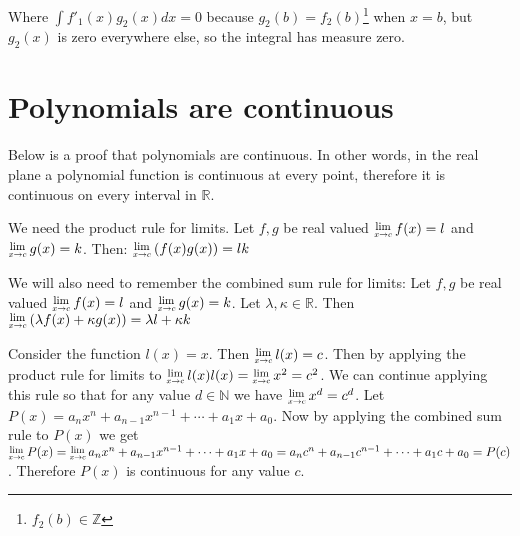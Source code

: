 \documentclass[12pt]{article}
\newcommand{\Lim}[1]{\raisebox{0.5ex}{\scalebox{0.8}{$\displaystyle \lim_{#1}\;$}}}
\begin{document}
\begin{appendices}
Where $\int f'_1(x) g_2(x) dx = 0$ because $g_2(b) = f_2(b)$\footnote{$f_2(b) \in \mathbb{Z}$} when $x=b$, but $g_2(x)$ is zero everywhere else, so the integral has measure zero.



\section*{Polynomials are continuous}
Below is a proof that polynomials are continuous.  In other words, in the real plane a polynomial function is continuous at every point, therefore it is continuous on every interval in $\mathbb{R}$.

We need the product rule for limits.  Let $f,g$ be real valued $\Lim{x \rightarrow c} f(x) = l$ and $\Lim{x \rightarrow c} g(x) = k$.  Then: $\Lim{x \rightarrow c}(f(x)g(x)) = lk$

We will also need to remember the combined sum rule for limits:
Let $f,g$ be real valued $\Lim{x \rightarrow c} f(x) = l$ and $\Lim{x \rightarrow c} g(x) = k$.  Let $\lambda, \kappa \in \mathbb{R}$.  Then $\Lim{x \rightarrow c}(\lambda f(x) + \kappa g(x)) = \lambda l + \kappa k$

Consider the function $l(x) = x$.  Then $\Lim{x \rightarrow c} l(x) =c$.  Then by applying the product rule for limits to $\Lim{x \rightarrow c} l(x) l(x) = \Lim{x \rightarrow c} x^2 =c^2$.  We can continue applying this rule so that for any value $d \in \mathbb{N}$ we have $\Lim{x \rightarrow c} x^d = c^d$.  Let $P(x)=a_nx^n +a_{n-1}x^{n-1}+ \cdots + a_1x+a_0$.  Now by applying the combined sum rule to $P(x)$ we get $\Lim{x \rightarrow c} P(x) = \Lim{x \rightarrow c} a_nx^n +a_{n-1}x^{n-1}+ \cdots + a_1x+a_0 = a_nc^n +a_{n-1}c^{n-1}+ \cdots + a_1c+a_0 = P(c)$.  Therefore $P(x)$ is continuous for any value $c$.






\end{appendices}
\end{document}
